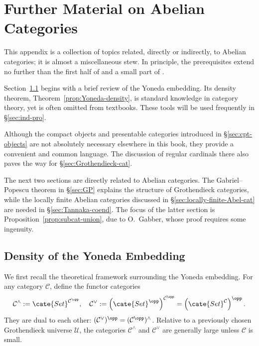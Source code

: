 
\chapter{Further Material on Abelian Categories}\label{sec:app-Abel}
\hypertarget{o014.aljabr2.appendix1.yoneda-density}{ }
This appendix is a collection of topics related, directly or indirectly, to Abelian categories; it is almost a miscellaneous stew. In principle, the prerequisites extend no further than the first half of  and a small part of .

Section~\ref{sec:Yoneda} begins with a brief review of the Yoneda embedding. Its density theorem, Theorem~\ref{prop:Yoneda-density}, is standard knowledge in category theory, yet is often omitted from textbooks. These tools will be used frequently in \S\ref{sec:ind-pro}.

Although the compact objects and presentable categories introduced in \S\ref{sec:cpt-objects} are not absolutely necessary elsewhere in this book, they provide a convenient and common language. The discussion of regular cardinals there also paves the way for \S\ref{sec:Grothendieck-cat}.

The next two sections are directly related to Abelian categories. The Gabriel--Popescu theorem in \S\ref{sec:GP} explains the structure of Grothendieck categories, while the locally finite Abelian categories discussed in \S\ref{sec:locally-finite-Abel-cat} are needed in \S\ref{sec:Tannaka-coend}. The focus of the latter section is Proposition~\ref{prop:subcat-union}, due to O.\ Gabber, whose proof requires some ingenuity.

\section{Density of the Yoneda Embedding}\label{sec:Yoneda}
We first recall the theoretical framework surrounding the Yoneda embedding. For any category $\mathcal{C}$, define the functor categories
\[ \mathcal{C}^\wedge := \cate{Set}^{\mathcal{C}^{\opp}}, \quad \mathcal{C}^\vee := \left(\cate{Set}^{\opp}\right)^{\mathcal{C}^{\opp}} = \left( \cate{Set}^{\mathcal{C}} \right)^{\opp}. \]
They are dual to each other:
$(\mathcal{C}^\vee)^{\opp}=(\mathcal{C}^{\opp})^\wedge$. Relative to a previously chosen Grothendieck universe $\mathcal{U}$, the categories $\mathcal{C}^\wedge$ and $\mathcal{C}^\vee$ are generally large unless $\mathcal{C}$ is small.

